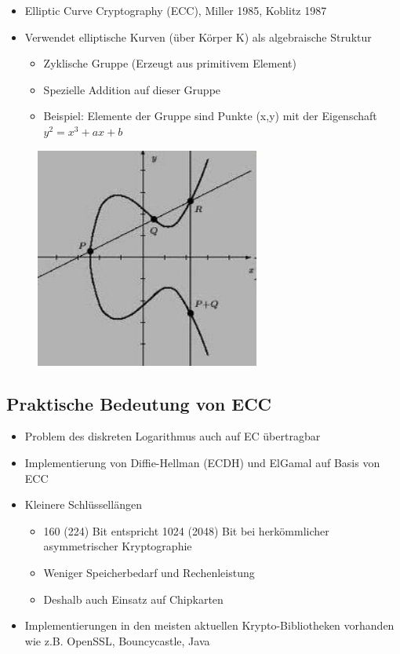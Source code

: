 \documentclass[openany]{book}
\begin{document}
\begin{itemize}
    \item Elliptic Curve Cryptography (ECC), Miller 1985, Koblitz 1987
    \item Verwendet elliptische Kurven (über Körper K) als algebraische Struktur
    \begin{itemize}
        \item Zyklische Gruppe (Erzeugt aus primitivem Element)
        \item Spezielle Addition auf dieser Gruppe
        \item Beispiel: Elemente der Gruppe sind Punkte (x,y) mit der Eigenschaft $y^2=x^3+ax+b$ 
    \end{itemize}
\end{itemize}

\newpage

\begin{figure}[h!]
    \centering
    \includegraphics[width=0.5\linewidth]{Pics/ECC.PNG}
\end{figure} 

\subsection{Praktische Bedeutung von ECC}

\begin{itemize}
    \item Problem des diskreten Logarithmus auch auf EC übertragbar
    \item Implementierung von Diffie-Hellman (ECDH) und ElGamal auf Basis von ECC
    \item Kleinere Schlüssellängen
    \begin{itemize}
        \item 160 (224) Bit entspricht 1024 (2048) Bit bei herkömmlicher asymmetrischer Kryptographie
        \item Weniger Speicherbedarf und Rechenleistung
        \item Deshalb auch Einsatz auf Chipkarten
    \end{itemize}
    \item Implementierungen in den meisten aktuellen Krypto-Bibliotheken vorhanden wie z.B. OpenSSL, Bouncycastle, Java
\end{itemize}
\end{document}
